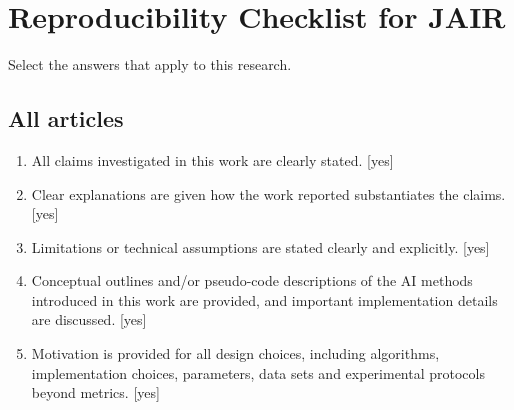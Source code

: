 \documentclass[]{jair}
\begin{document}


\appendix
\section{Reproducibility Checklist for JAIR}

Select the answers that apply to this research.

\subsection*{All articles}
\begin{enumerate}
    \item All claims investigated in this work are clearly stated. [yes]
    \item Clear explanations are given how the work reported substantiates the claims. [yes]
    \item Limitations or technical assumptions are stated clearly and explicitly. [yes]
    \item Conceptual outlines and/or pseudo-code descriptions of the AI methods introduced in this work are provided, and important implementation details are discussed. [yes]
    \item Motivation is provided for all design choices, including algorithms, implementation choices, parameters, data sets and experimental protocols beyond metrics. [yes]
\end{enumerate}
\end{document}
